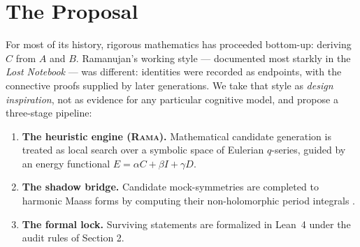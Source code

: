\documentclass[11pt,a4paper]{article}
\theoremstyle{plain}
\theoremstyle{definition}
\theoremstyle{remark}
\begin{document}
\section{The Proposal}\label{sec:proposal}
For most of its history, rigorous mathematics has proceeded bottom-up:
deriving $C$ from $A$ and $B$. Ramanujan's working style --- documented most
starkly in the \emph{Lost Notebook} \cite{Narosa1988, AndrewsBerndt} --- was different: identities were recorded as endpoints, with the connective proofs
supplied by later generations. We take that style as \emph{design
inspiration}, not as evidence for any particular cognitive model, and propose a three-stage pipeline:

\begin{enumerate}
\item \textbf{The heuristic engine (\textsc{Rama}).} Mathematical candidate
generation is treated as local search over a symbolic space of Eulerian
$q$-series, guided by an energy functional
$E=\alpha C+\beta I+\gamma D$.
\item \textbf{The shadow bridge.} Candidate mock-symmetries are completed to
harmonic Maass forms by computing their non-holomorphic period integrals \cite{Zwegers2002}.
\item \textbf{The formal lock.} Surviving statements are formalized in
Lean~4 under the audit rules of Section 2.
\end{enumerate}

\end{document}
